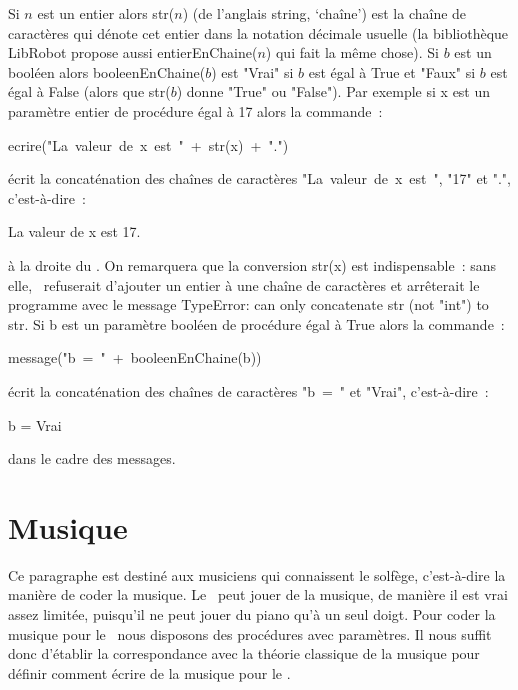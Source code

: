 Si $n$ est un entier alors {\idt str($n$)} (de l'anglais {\idt string}, `chaîne') est la chaîne de
caractères qui dénote cet entier dans la notation
décimale usuelle (la bibliothèque {\idt LibRobot} propose aussi {\idt entierEnChaine($n$)}
qui fait la même chose). Si $b$ est un booléen alors  {\idt booleenEnChaine($b$)} est
{\cha "Vrai"}
si $b$ est égal à {\mcl True} et
{\cha "Faux"}
si $b$ est égal à {\mcl False} (alors que {\idt str($b$)} donne {\cha "True"} ou
{\cha "False"}).
Par exemple si {\idt x} est un paramètre entier de procédure égal à 17 alors la
commande~:
\begin{center}
{\idt ecrire(}{\cha "La\ valeur\ de\ x\ est\ "}\ {\idt +\ str(x)\ +}\ {\cha "."}{\idt )}
\end{center}
\' ecrit la concaténation des chaînes  de caractères
{\cha "La\ valeur\ de\ x\ est\ "},
{\cha "17"}
et {\cha "."}, c'est-à-dire~:
\begin{center}
{\idt La valeur de x est 17.}
\end{center}
à la droite du \robot. On remarquera que la conversion {\idt str(x)} est indispensable~: sans elle,
\python\ refuserait d'ajouter un entier à une chaîne de caractères et arrêterait le programme avec
le message {\idt TypeError: can only concatenate str (not "int") to str}.
Si {\idt b} est un paramètre booléen de procédure égal à {\mcl True} alors la
commande~:
\begin{center}
{\idt message(}{\cha "b\ =\ "}\ {\idt +\ booleenEnChaine(b))}
\end{center}
écrit la concaténation des chaînes  de caractères
{\cha "b\ =\ "}
et {\cha "Vrai"}, c'est-à-dire~:
\begin{center}
{\idt b = Vrai}
\end{center}
dans le cadre des messages.


\section{Musique}

Ce paragraphe est destiné aux musiciens qui connaissent le solfège, c'est-à-dire la manière
de coder la musique.  Le \robot\ peut jouer de la musique, de
manière il est vrai assez limitée, puisqu'il ne peut jouer du piano qu'à un seul doigt. Pour
coder la musique pour le \robot\ nous disposons des procédures avec paramètres. Il
nous suffit donc d'établir la correspondance avec la théorie classique de la musique
\cite{solfege} pour définir comment écrire de la musique pour le \robot.

